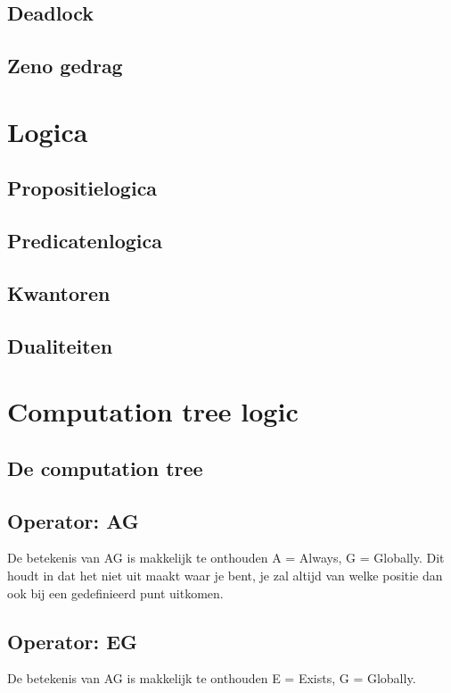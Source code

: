 \documentclass{article}%
\begin{document}
\subsection{Deadlock}

\subsection{Zeno gedrag}

\section{Logica}

\subsection{Propositielogica}

\subsection{Predicatenlogica}

\subsection{Kwantoren}

\subsection{Dualiteiten}

\section{Computation tree logic}

\subsection{De computation tree}

\subsection{Operator: AG}
De betekenis van AG is makkelijk te onthouden A = Always, G = Globally. Dit houdt in dat het niet uit maakt waar je bent, je zal altijd van welke positie dan ook bij een gedefinieerd punt uitkomen.

\subsection{Operator: EG}
De betekenis van AG is makkelijk te onthouden E = Exists, G = Globally.
\end{document}

